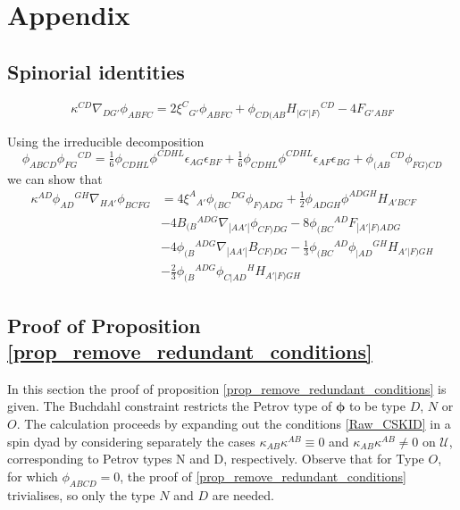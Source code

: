 \documentclass[10pt,a4paper]{article}
\theoremstyle{plain}
\begin{document}
\section{Appendix}\label{Appendix_A}

\subsection{Spinorial identities}

\begin{equation}
 \kappa^{CD} \nabla_{DG'}\phi_{ABFC} = 2 \xi^{C}{}_{G'} \phi_{ABFC} +
 \phi_{CD(AB} H_{\vert G'\vert F)}{}^{CD} - 4
 F_{G'ABF}\label{Eq:MiscIdentity}
 \end{equation}
 
 Using the irreducible decomposition
\begin{equation}
\phi_{ABCD} \phi_{FG}{}^{CD} = \tfrac{1}{6} \phi_{CDHL} \phi^{CDHL}
\epsilon_{AG} \epsilon_{BF} + \tfrac{1}{6} \phi_{CDHL} \phi^{CDHL}
\epsilon_{AF} \epsilon_{BG} +
\phi_{(AB}{}^{CD}\phi_{FG)CD} \label{Eq:DecompPhiSquared}
\end{equation}
we can show that
\begin{align}
    \kappa^{AD} \phi_{AD}{}^{GH} \nabla_{HA'}\phi_{BCFG} &= 4
    \xi^{A}{}_{A'}\phi_{(BC}{}^{DG}\phi_{F)ADG} + \tfrac{1}{2}
    \phi_{ADGH} \phi^{ADGH} H_{A'BCF} \nonumber\\ & - 4
    B_{(B}{}^{ADG}\nabla_{|AA'|}\phi_{CF)DG} - 8
    \phi_{(BC}{}^{AD}F_{|A'|F)ADG}\nonumber \\ & - 4
    \phi_{(B}{}^{ADG}\nabla_{|AA'|}B_{CF)DG} - \tfrac{1}{3}
    \phi_{(BC}{}^{AD}\phi_{|AD}{}^{GH}H_{A'|F)GH}\nonumber \\ & -
    \tfrac{2}{3}
    \phi_{(B}{}^{ADG}\phi_{C|AD}{}^{H}H_{A'|F)GH} \label{Eq:MiscIdentity3}
\end{align}




\subsection{Proof of Proposition \ref{prop_remove_redundant_conditions}}
\label{Sec:ProofOfProp3}

In this section the proof of proposition
\ref{prop_remove_redundant_conditions} is given.
The Buchdahl constraint restricts the Petrov type of
$\bm\phi$ to be type $D$, $N$ or $O$.
The calculation proceeds by expanding out the
conditions \eqref{Raw_CSKID} in a spin dyad
by considering separately the cases $\kappa_{AB}\kappa^{AB}\equiv 0$
and $\kappa_{AB}\kappa^{AB}\neq 0$ on $\mathcal{U}$, corresponding to Petrov types N and D, respectively.
Observe that for Type $O$, for which $\phi_{ABCD}=0$,
the proof of \ref{prop_remove_redundant_conditions} trivialises,
so only the type $N$ and $D$ are needed.
\\
\end{document}
